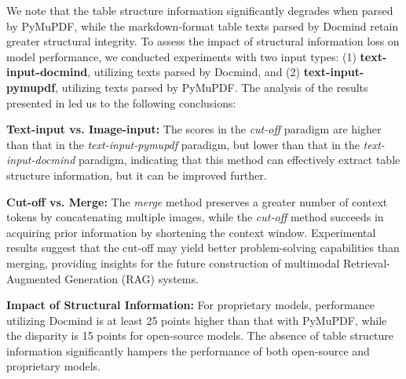 We note that the table structure information significantly degrades when parsed by PyMuPDF, while the markdown-format table texts parsed by Docmind retain greater structural integrity. To assess the impact of structural information loss on model performance, we conducted experiments with two input types: (1) \textbf{text-input-docmind}, utilizing texts parsed by Docmind, and (2) \textbf{text-input-pymupdf}, utilizing texts parsed by PyMuPDF. The analysis of the results presented in  led us to the following conclusions:

\noindent\textbf{Text-input vs. Image-input:} 
The scores in the \emph{cut-off} paradigm are higher than that in the \emph{text-input-pymupdf} paradigm, but lower than that in the \emph{text-input-docmind} paradigm, indicating that this method can effectively extract table structure information, but it can be improved further. 

\noindent\textbf{Cut-off vs. Merge:}
The \emph{merge} method preserves a greater number of context tokens by concatenating multiple images, while the \emph{cut-off} method succeeds in acquiring prior information by shortening the context window. Experimental results suggest that the cut-off may yield better problem-solving capabilities than merging, providing insights for the future construction of multimodal Retrieval-Augmented Generation (RAG) systems.

\noindent\textbf{Impact of Structural Information:}
For proprietary models, performance utilizing Docmind is at least 25 points higher than that with PyMuPDF, while the disparity is 15 points for open-source models. The absence of table structure information significantly hampers the performance of both open-source and proprietary models.

